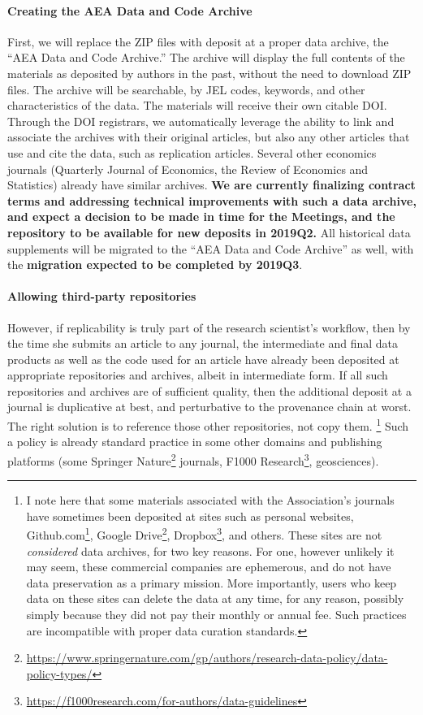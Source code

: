 \documentclass[AEJ]{AEA}
\newcommand{\urlcite}[2]{#2\footnote{\url{#1}}}
\begin{document}
\paragraph{Creating the AEA Data and Code Archive} First, we will replace the ZIP files with deposit at a proper data archive, the ``AEA Data and Code Archive.'' The archive will display the full contents of the materials as deposited by authors in the past, without the need to download ZIP files. The archive will be searchable, by JEL codes, keywords, and other characteristics of the data. The materials will receive their own citable \ac{DOI}. Through the \ac{DOI} registrars, we automatically leverage the ability to link and associate the archives with their original articles, but also any other articles that use and cite the data, such as replication articles. Several other economics journals (Quarterly Journal of Economics, the Review of Economics and Statistics) already have similar archives. \textbf{We are currently finalizing contract terms and addressing technical improvements with such a data archive, and expect a decision to be made in time for the Meetings, and the repository to be available for new deposits in 2019Q2.} All historical data supplements will be migrated to the ``AEA Data and Code Archive'' as well, with the \textbf{migration expected to be completed by 2019Q3}.

\paragraph{Allowing third-party repositories} However, if replicability is truly part of the research scientist's workflow, then by the time she submits an article to any journal, the intermediate and final data products as well as the code used for an article have already been deposited at appropriate repositories and archives, albeit in intermediate form. If all such repositories and archives are of sufficient quality, then the additional deposit at a journal is duplicative at best, and perturbative to the provenance chain at worst. The right solution is to reference those other repositories, not copy them.%
\footnote{I note here that some materials associated with the Association's journals have sometimes been deposited at sites such as personal websites, \urlcite{https://github.com}{Github.com}, \urlcite{https://drive.google.com}{Google Drive}, \urlcite{https://dropbox.com}{Dropbox}, and others. These sites are not \textit{considered} data archives, for two key reasons. For one, however unlikely it may seem, these commercial companies are ephemerous, and do not have data preservation as a primary mission. More importantly, users who keep data on these sites can delete the data at any time, for any reason, possibly simply because they did not pay their monthly or annual fee. Such practices are incompatible with proper data curation standards. }
Such a policy is already standard practice in some other domains and publishing platforms (some \urlcite{https://www.springernature.com/gp/authors/research-data-policy/data-policy-types/}{Springer Nature} journals, \urlcite{https://f1000research.com/for-authors/data-guidelines}{F1000 Research}, geosciences).
\end{document}
